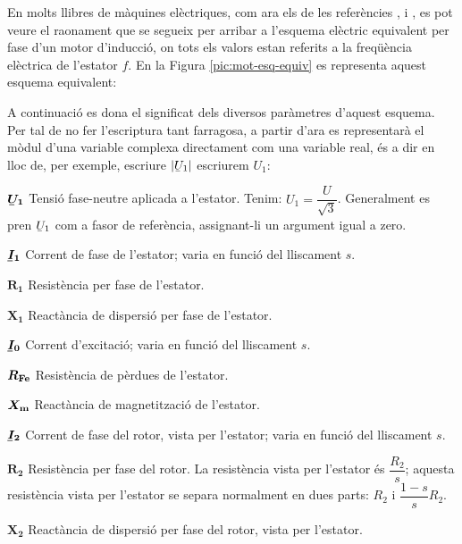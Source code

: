En molts llibres de màquines elèctriques, com ara els de les referències \cite{CHA}, \cite{FIT} i \cite{JFM}, es pot veure el raonament que se segueix per arribar a l'esquema elèctric equivalent per fase d'un motor d'inducció, on tots els valors estan referits a la freqüència elèctrica de l'estator $f$. En la Figura \vref{pic:mot-esq-equiv} es representa aquest esquema equivalent:

\begin{center}
    
    \label{pic:mot-esq-equiv}
\end{center}

A continuació es dona el significat dels diversos paràmetres d'aquest esquema. Per tal de no fer l'escriptura tant farragosa, a partir d'ara es representarà el mòdul d'una variable complexa  directament com una variable real, és a dir en lloc de, per exemple, escriure $|\cmplx{U}_1|$ escriurem $U_1$:

\begin{list}{}
   {\setlength{\labelwidth}{12mm} \setlength{\leftmargin}{12mm} \setlength{\labelsep}{2mm}}
   \item[$\boldsymbol{\cmplx{U}_1}$] Tensió fase-neutre aplicada a l'estator. Tenim: $U_1 = \dfrac{U}{\sqrt{3}}$. Generalment   es pren $\cmplx{U}_1$ com a fasor de referència, assignant-li un argument igual a zero.
   \item[$\boldsymbol{\cmplx{I}_1}$] Corrent de fase de l'estator; varia en funció del lliscament $s$.
   \item[$\boldsymbol{R_1}$] Resistència per fase de l'estator.
   \item[$\boldsymbol{X_1}$] Reactància de dispersió per fase de l'estator.
   \item[$\boldsymbol{\cmplx{I}_0}$] Corrent d'excitació; varia en funció del lliscament $s$.
   \item[$\boldsymbol{R_\mathrm{Fe}}$] Resistència de pèrdues de l'estator.
   \item[$\boldsymbol{X_\mathrm{m}}$] Reactància de magnetització de l'estator.
   \item[$\boldsymbol{\cmplx{I}_2}$] Corrent de fase del rotor, vista per l'estator; varia en funció del lliscament $s$.
   \item[$\boldsymbol{R_2}$] Resistència per fase del rotor. La resistència vista per l'estator és $\dfrac{R_2}{s}$; aquesta resistència vista per l'estator se separa normalment en dues parts: $R_2$ i $\dfrac{1-s}{s} R_2$.
   \item[$\boldsymbol{X_2}$] Reactància de dispersió per fase del rotor, vista per l'estator.
\end{list}

